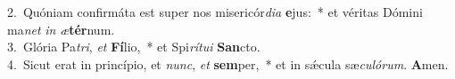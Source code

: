 {2.~}Quóniam confirmáta est super nos misericór\textit{di}\textit{a} \textbf{e}jus:~* et véritas Dómini ma\textit{net} \textit{in} \textit{æ}\textbf{tér}num.\\
{3.~}Glória Pa\textit{tri}, \textit{et} \textbf{Fí}lio,~* et Spi\textit{rí}\textit{tu}\textit{i} \textbf{San}cto.\\
{4.~}Sicut erat in princípio, et \textit{nunc}, \textit{et} \textbf{sem}per,~* et in sǽcula sæ\textit{cu}\textit{ló}\textit{rum}. \textbf{A}men.\\
